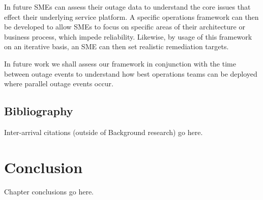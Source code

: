 In future SMEs can assess their outage data to understand the core issues that effect their underlying service platform. A specific operations framework can then be developed to allow SMEs to focus on specific areas of their architecture or business process, which impede reliability. Likewise, by usage of this framework on an iterative basis, an SME can then set realistic remediation targets. \par

In future work we shall assess our framework in conjunction with the time between outage events to understand how best operations teams can be deployed where parallel outage events occur.  \par

\subsection{Bibliography}
Inter-arrival citations (outside of Background research) go here. 


\section{Conclusion}
Chapter conclusions go here.

